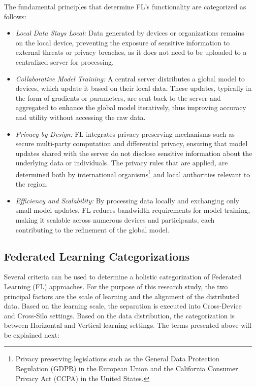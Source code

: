 \noindent The fundamental principles that determine FL's functionality are categorized as follows\cite{hacksFederatedLearningParadigm2024}:
\begin{itemize}
    \item \emph{Local Data Stays Local:} Data generated by devices or organizations remains on the local device, preventing
          the exposure of sensitive information to external threats or privacy breaches, as it does not need to be uploaded
          to a centralized server for processing.
    \item \emph{Collaborative Model Training:} A central server distributes a global model to devices, which update it based
          on their local data. These updates, typically in the form of gradients or parameters, are sent back to the server and aggregated
          to enhance the global model iteratively, thus improving accuracy and utility without accessing the raw data.
    \item \emph{Privacy by Design:} FL integrates privacy-preserving mechanisms such as secure multi-party computation and
          differential privacy, ensuring that model updates shared with the server do not disclose sensitive information
          about the underlying data or individuals. The privacy rules that are applied, are determined both by international organisms\footnote{Privacy
              preserving legislations such as the General Data Protection Regulation (GDPR) in the European Union
              and the California Consumer Privacy Act (CCPA) in the United States\cite{GeneralDataProtection,CaliforniaConsumerPrivacy}.}
          and local authorities relevant to the region.
    \item \emph{Efficiency and Scalability:} By processing data locally and exchanging only small model updates, FL reduces bandwidth
          requirements for model training, making it scalable across numerous devices and participants, each contributing
          to the refinement of the global model.
\end{itemize}


\subsection{Federated Learning Categorizations}
Several criteria can be used to determine a holistic categorization of Federated Learning (FL) approaches\cite{caruccioSurveyingFederatedLearning2024}.
For the purpose of this research study, the two principal factors are the scale of learning and the alignment of the distributed data. Based on
the learning scale, the separation is executed into Cross-Device and Cross-Silo settings. Based on the data distribution, the
categorization is between Horizontal and Vertical learning settings. The terms presented above will be explained next:

